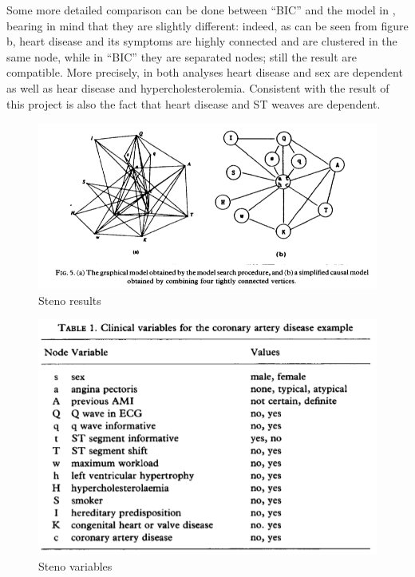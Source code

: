 \documentclass{article}
\begin{document}
Some more detailed comparison can be done between ``BIC'' and the model in \cite{Steno}, bearing in mind that they are slightly different: indeed, as can be seen from figure b, heart disease and its symptoms are highly connected and are clustered  in the same node, while in ``BIC'' they are separated nodes; still the result are compatible. More precisely, in both analyses heart disease and sex are dependent as well as hear disease and hypercholesterolemia. Consistent with the result of this project is also the fact that heart disease and ST weaves are dependent.
\begin{figure}[H]
       \centering
       \includegraphics[width=1\textwidth]{Steno graph.PNG}
       \caption{Steno results \cite{Steno}}
\end{figure}

\begin{figure}[H]
       \centering
       \includegraphics[width=1\textwidth]{steno variables.PNG}
       \caption{Steno variables \cite{Steno}}
\end{figure}
\end{document}
